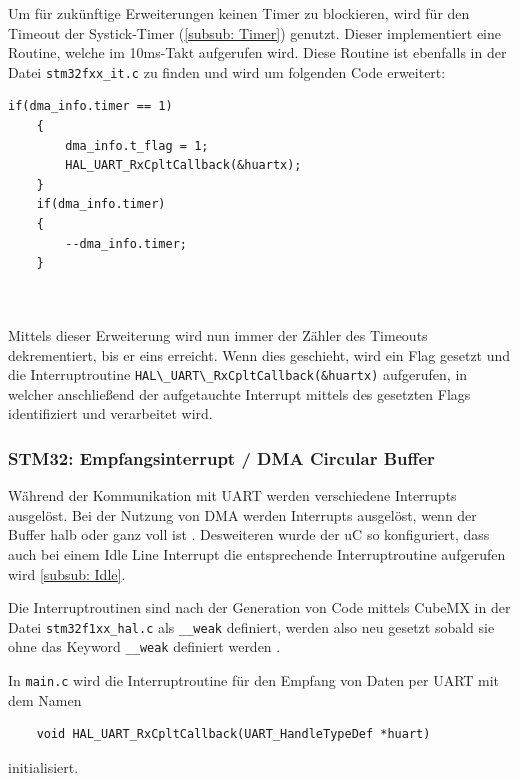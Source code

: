   \smallskip

  Um für zukünftige Erweiterungen keinen Timer zu blockieren, wird für den Timeout der Systick-Timer (\ref{subsub: Timer}) genutzt. Dieser implementiert eine Routine,
  welche im 10ms-Takt aufgerufen wird. Diese Routine ist ebenfalls in der Datei \lstinline!stm32fxx_it.c! zu finden und wird um folgenden Code
  erweitert:

  \begin{lstlisting}[caption={\textit{Systick Timer}}]
    if(dma_info.timer == 1)
    {
        dma_info.t_flag = 1;
        HAL_UART_RxCpltCallback(&huartx);
    }
    if(dma_info.timer) 
    { 
        --dma_info.timer; 
    }



  \end{lstlisting}
  
  Mittels dieser Erweiterung wird nun immer der Zähler des Timeouts dekrementiert, bis er eins erreicht. Wenn dies geschieht, wird ein Flag gesetzt
  und die Interruptroutine \lstinline!HAL\_UART\_RxCpltCallback(&huartx)! aufgerufen, in welcher anschließend der aufgetauchte Interrupt mittels des
  gesetzten Flags identifiziert und verarbeitet wird.
  
  \subsubsection{STM32: Empfangsinterrupt / DMA Circular Buffer}
  \label{subsub: Empfang}

  Während der Kommunikation mit \ac{UART} werden verschiedene Interrupts ausgelöst. Bei der Nutzung von \ac{DMA} werden Interrupts ausgelöst,
  wenn der Buffer halb oder ganz voll ist \citep{STM32_Ref}. Desweiteren wurde der \ac{uC} so konfiguriert, dass auch bei einem Idle Line Interrupt
  die entsprechende Interruptroutine aufgerufen wird \ref{subsub: Idle}.

  \smallskip

  Die Interruptroutinen sind nach der Generation von Code mittels CubeMX in der Datei \lstinline!stm32f1xx_hal.c! als \lstinline!__weak!
  definiert, werden also neu gesetzt sobald sie ohne das Keyword \lstinline!__weak! definiert werden \citep{HAL_Description}. 

  \smallskip

  In \lstinline!main.c! wird die Interruptroutine für den Empfang von Daten per \ac{UART} mit dem Namen 
  \begin{lstlisting}
    void HAL_UART_RxCpltCallback(UART_HandleTypeDef *huart)
  \end{lstlisting}
  initialisiert. 
  
